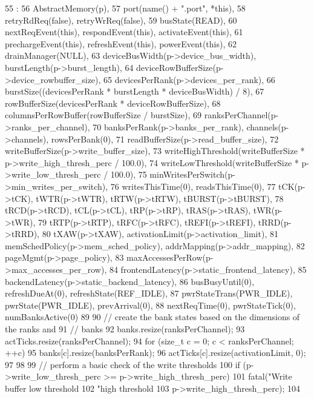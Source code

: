 \begin{DoxyCode}
55                                           :
56     AbstractMemory(p),
57     port(name() + ".port", *this),
58     retryRdReq(false), retryWrReq(false),
59     busState(READ),
60     nextReqEvent(this), respondEvent(this), activateEvent(this),
61     prechargeEvent(this), refreshEvent(this), powerEvent(this),
62     drainManager(NULL),
63     deviceBusWidth(p->device_bus_width), burstLength(p->burst_length),
64     deviceRowBufferSize(p->device_rowbuffer_size),
65     devicesPerRank(p->devices_per_rank),
66     burstSize((devicesPerRank * burstLength * deviceBusWidth) / 8),
67     rowBufferSize(devicesPerRank * deviceRowBufferSize),
68     columnsPerRowBuffer(rowBufferSize / burstSize),
69     ranksPerChannel(p->ranks_per_channel),
70     banksPerRank(p->banks_per_rank), channels(p->channels), rowsPerBank(0),
71     readBufferSize(p->read_buffer_size),
72     writeBufferSize(p->write_buffer_size),
73     writeHighThreshold(writeBufferSize * p->write_high_thresh_perc / 100.0),
74     writeLowThreshold(writeBufferSize * p->write_low_thresh_perc / 100.0),
75     minWritesPerSwitch(p->min_writes_per_switch),
76     writesThisTime(0), readsThisTime(0),
77     tCK(p->tCK), tWTR(p->tWTR), tRTW(p->tRTW), tBURST(p->tBURST),
78     tRCD(p->tRCD), tCL(p->tCL), tRP(p->tRP), tRAS(p->tRAS), tWR(p->tWR),
79     tRTP(p->tRTP), tRFC(p->tRFC), tREFI(p->tREFI), tRRD(p->tRRD),
80     tXAW(p->tXAW), activationLimit(p->activation_limit),
81     memSchedPolicy(p->mem_sched_policy), addrMapping(p->addr_mapping),
82     pageMgmt(p->page_policy),
83     maxAccessesPerRow(p->max_accesses_per_row),
84     frontendLatency(p->static_frontend_latency),
85     backendLatency(p->static_backend_latency),
86     busBusyUntil(0), refreshDueAt(0), refreshState(REF_IDLE),
87     pwrStateTrans(PWR_IDLE), pwrState(PWR_IDLE), prevArrival(0),
88     nextReqTime(0), pwrStateTick(0), numBanksActive(0)
89 {
90     // create the bank states based on the dimensions of the ranks and
91     // banks
92     banks.resize(ranksPerChannel);
93     actTicks.resize(ranksPerChannel);
94     for (size_t c = 0; c < ranksPerChannel; ++c) {
95         banks[c].resize(banksPerRank);
96         actTicks[c].resize(activationLimit, 0);
97     }
98 
99     // perform a basic check of the write thresholds
100     if (p->write_low_thresh_perc >= p->write_high_thresh_perc)
101         fatal("Write buffer low threshold %
102               "high threshold %
103               p->write_high_thresh_perc);
104 
}
\end{DoxyCode}
